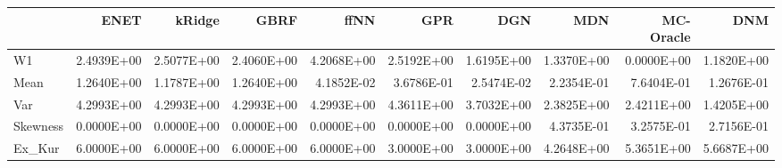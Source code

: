 \begin{tabular}{lrrrrrrrrr}
\toprule
{} &       ENET &     kRidge &       GBRF &       ffNN &        GPR &        DGN &        MDN &  MC-Oracle &        DNM \\
\midrule
W1       & 2.4939E+00 & 2.5077E+00 & 2.4060E+00 & 4.2068E+00 & 2.5192E+00 & 1.6195E+00 & 1.3370E+00 & 0.0000E+00 & 1.1820E+00 \\
Mean     & 1.2640E+00 & 1.1787E+00 & 1.2640E+00 & 4.1852E-02 & 3.6786E-01 & 2.5474E-02 & 2.2354E-01 & 7.6404E-01 & 1.2676E-01 \\
Var      & 4.2993E+00 & 4.2993E+00 & 4.2993E+00 & 4.2993E+00 & 4.3611E+00 & 3.7032E+00 & 2.3825E+00 & 2.4211E+00 & 1.4205E+00 \\
Skewness & 0.0000E+00 & 0.0000E+00 & 0.0000E+00 & 0.0000E+00 & 0.0000E+00 & 0.0000E+00 & 4.3735E-01 & 3.2575E-01 & 2.7156E-01 \\
Ex\_Kur   & 6.0000E+00 & 6.0000E+00 & 6.0000E+00 & 6.0000E+00 & 3.0000E+00 & 3.0000E+00 & 4.2648E+00 & 5.3651E+00 & 5.6687E+00 \\
\bottomrule
\end{tabular}

